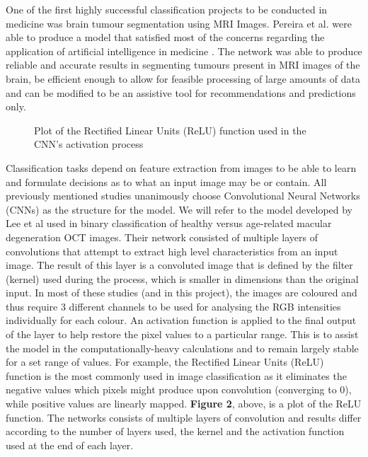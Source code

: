 \documentclass[a4paper]{article}
\begin{document}
        One of the first highly successful classification projects to be conducted in medicine was brain tumour segmentation using MRI Images. Pereira et al. were able to produce a model that satisfied most of the concerns regarding the application of artificial intelligence in medicine \cite{RN18}. The network was able to produce reliable and accurate results in segmenting tumours present in MRI images of the brain, be efficient enough to allow for feasible processing of large amounts of data and can be modified to be an assistive tool for recommendations and predictions only.
        \vspace{3mm}

        \begin{figure}
            \centering
            \caption{\label{fig:5} Plot of the Rectified Linear Units (ReLU) function used in the CNN's activation process}
        \end{figure}

        Classification tasks depend on feature extraction from images to be able to learn and formulate decisions as to what an input image may be or contain. All previously mentioned studies unanimously choose Convolutional Neural Networks (CNNs) as the structure for the model. We will refer to the model developed by Lee et al used in binary classification of healthy versus age-related macular degeneration OCT images. Their network consisted of multiple layers of convolutions that attempt to extract high level characteristics from an input image. The result of this layer is a convoluted image that is defined by the filter (kernel) used during the process, which is smaller in dimensions than the original input. In most of these studies (and in this project), the images are coloured and thus require 3 different channels to be used for analysing the RGB intensities individually for each colour. An activation function is applied to the final output of the layer to help restore the pixel values to a particular range. This is to assist the model in the computationally-heavy calculations and to remain largely stable for a set range of values. For example, the Rectified Linear Units (ReLU) function is the most commonly used in image classification as it eliminates the negative values which pixels might produce upon convolution (converging to 0), while positive values are linearly mapped. \textbf{Figure 2}, above, is a plot of the ReLU function. The networks consists of multiple layers of convolution and results differ according to the number of layers used, the kernel and the activation function used at the end of each layer.
        \vspace{3mm}
\end{document}
